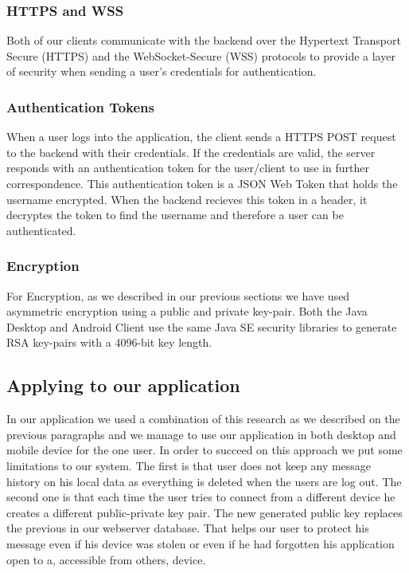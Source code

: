 \documentclass[11pt,a4paper]{report}
\begin{document}
\subsubsection{HTTPS and WSS}
Both of our clients communicate with the backend over the Hypertext Transport Secure (HTTPS) and the WebSocket-Secure (WSS) protocols to provide a layer of security when sending a user's credentials for authentication.

\subsubsection{Authentication Tokens}
When a user logs into the application, the client sends a HTTPS POST request to the backend with their credentials. If the credentials are valid, the server responds with an authentication token for the user/client to use in further correspondence. This authentication token is a JSON Web Token \cite{website:json_web_tokens} that holds the username encrypted. When the backend recieves this token in a header, it decryptes the token to find the username and therefore a user can be authenticated.

\subsubsection{Encryption}
For Encryption, as we described in our previous sections we have used asymmetric encryption using a public and private key-pair. Both the Java Desktop and Android Client use the same Java SE security libraries to generate RSA key-pairs with a 4096-bit key length.

\subsection{Applying to our application}
In our application we used a combination of this research as we described on the previous paragraphs and we manage to use our application in both desktop and mobile device for the one user. In order to succeed on this approach we put some limitations to our system. The first is that user does not keep any message history on his local data as everything is deleted when the users are log out. The second one is that each time the user tries to connect from a different device he creates a different public-private key pair. The new generated public key replaces the previous in our webserver database. That helps our user to protect his message even if his device was stolen or even if he had forgotten his application open to a, accessible from others, device.
\end{document}
